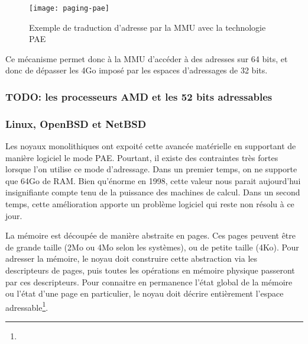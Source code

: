       \begin{figure}[h]
        \centering \texttt{[image: paging-pae]}
        \caption{Exemple de traduction d'adresse par la MMU avec la technologie
          PAE}
        \label{fig:paging-pae}
      \end{figure}
      
      Ce mécanisme permet donc à la MMU d'accéder à des adresses sur 64 bits, et
      donc de dépasser les 4Go imposé par les espaces d'adressages de 32 bits.


    \subsubsection{TODO: les processeurs AMD et les 52 bits adressables}

    \subsubsection{Linux, OpenBSD et NetBSD}

      Les noyaux monolithiques ont expoité cette avancée matérielle en
      supportant de manière logiciel le mode PAE. Pourtant, il existe des
      contraintes très fortes lorsque l'on utilise ce mode d'adressage. Dans un
      premier temps, on ne supporte que 64Go de RAM. Bien qu'énorme en 1998,
      cette valeur nous parait aujourd'hui insignifiante compte tenu de la
      puissance des machines de calcul.  Dans un second temps, cette
      amélioration apporte un problème logiciel qui reste non résolu à ce
      jour.\newline

      La mémoire est découpée de manière abstraite en pages. Ces pages peuvent
      être de grande taille (2Mo ou 4Mo selon les systèmes), ou de petite taille
      (4Ko). Pour adresser la mémoire, le noyau doit construire cette
      abstraction via les descripteurs de pages, puis toutes les opérations en
      mémoire physique passeront par ces descripteurs. Pour connaitre en
      permanence l'état global de la mémoire ou l'état d'une page en
      particulier, le noyau doit décrire entièrement l'espace
      adressable\footnote{}.

